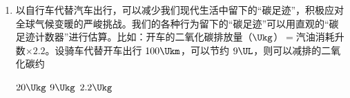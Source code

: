 \documentclass[\gkver]{gaokaozhenti}
\begin{document}
\begin{enumerate}
在额定输出功率不变的情况下，质量为 $60\Ukg$ 的人骑着此自行车沿平直公路行驶，所受阻力恒为车和人总重的 0.04 倍。当此电动车达到最大速度时，牵引力为 \tkanswer[1.5cm]{} $\UN$，当车速为 $2\Ums$ 时，其加速度为 \tkanswer[1.5cm]{} $\Umsq$（$g=10\Umsq$）。



\item
以自行车代替汽车出行，可以减少我们现代生活中留下的“碳足迹”，积极应对全球气候变暖的严峻挑战。我们的各种行为留下的“碳足迹”可以用直观的“碳足迹计数器”进行估算。比如：开车的二氧化碳排放量（$\Ukg$）$=$汽油消耗升数$\times 2.2$。设骑车代替开车出行 $100\Ukm$，可以节约 $9\UL$，则可以减排的二氧化碳约

\fourchoices[answer=B]
{$100\Ukg$}
{$20\Ukg$}
{$9\Ukg$}
{$2.2\Ukg$}


\end{enumerate}
\end{document}

